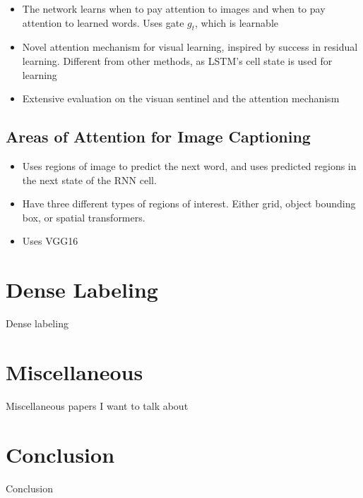 \documentclass[10pt,twocolumn,letterpaper]{article}
\begin{document}
\begin{itemize}
  \item The network learns when to pay attention to images and when to pay
        attention to learned words. Uses gate $g_t$, which is learnable
  \item Novel attention mechanism for visual learning, inspired by success in
        residual learning. Different from other methods, as LSTM's cell state
        is used for learning
  \item Extensive evaluation on the visuan sentinel and the attention mechanism
\end{itemize}

\subsection{Areas of Attention for Image Captioning}

\begin{itemize}
  \item Uses regions of image to predict the next word, and uses predicted
        regions in the next state of the RNN cell.
  \item Have three different types of regions of interest. Either grid, object
        bounding box, or spatial transformers.
  \item Uses VGG16
\end{itemize}

\section{Dense Labeling}

Dense labeling

\section{Miscellaneous}

Miscellaneous papers I want to talk about

\section{Conclusion}

Conclusion

{\small


}
\end{document}
